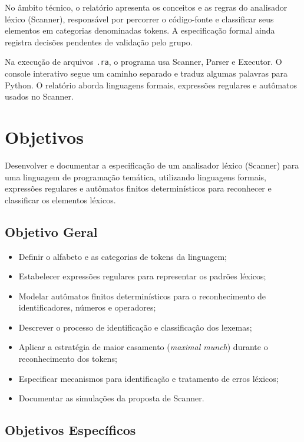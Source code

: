 \documentclass[12pt,a4paper]{article}
\begin{document}
No âmbito técnico, o relatório apresenta os conceitos e as regras do analisador léxico (Scanner), responsável por percorrer o código-fonte e classificar seus elementos em categorias denominadas tokens. A especificação formal ainda registra decisões pendentes de validação pelo grupo.

Na execução de arquivos \texttt{.ra}, o programa usa Scanner, Parser e Executor. O console interativo segue um caminho separado e traduz algumas palavras para Python. O relatório aborda linguagens formais, expressões regulares e autômatos usados no Scanner.


\section{Objetivos}

Desenvolver e documentar a especificação de um analisador léxico (Scanner) para uma linguagem de programação temática, utilizando linguagens formais, expressões regulares e autômatos finitos determinísticos para reconhecer e classificar os elementos léxicos.

\subsection{Objetivo Geral}

\begin{itemize}
    \item Definir o alfabeto e as categorias de tokens da linguagem;
    \item Estabelecer expressões regulares para representar os padrões léxicos;
    \item Modelar autômatos finitos determinísticos para o reconhecimento de identificadores, números e operadores;
    \item Descrever o processo de identificação e classificação dos lexemas;
    \item Aplicar a estratégia de maior casamento (\textit{maximal munch}) durante o reconhecimento dos tokens;
    \item Especificar mecanismos para identificação e tratamento de erros léxicos;
    \item Documentar as simulações da proposta de Scanner.
\end{itemize}


\subsection{Objetivos Específicos}
\end{document}
